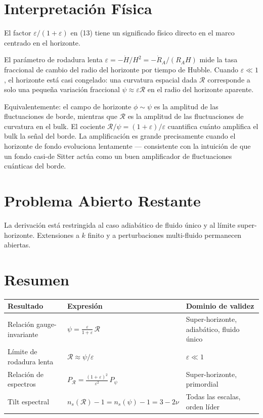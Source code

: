 \documentclass[12pt,a4paper]{article}
\begin{document}
\section{Interpretación Física}

El factor $\varepsilon/(1+\varepsilon)$ en (13) tiene un significado físico directo en el marco centrado en el horizonte.

El parámetro de rodadura lenta $\varepsilon = -\dot{H}/H^2 = -\dot{R}_A/(R_A H)$ mide la tasa fraccional de cambio del radio del horizonte por tiempo de Hubble. Cuando $\varepsilon \ll 1$, el horizonte está casi congelado: una curvatura espacial dada $\mathcal{R}$ corresponde a solo una pequeña variación fraccional $\psi \approx \varepsilon \mathcal{R}$ en el radio del horizonte aparente.

Equivalentemente: el campo de horizonte $\phi \sim \psi$ es la amplitud de las fluctuaciones de borde, mientras que $\mathcal{R}$ es la amplitud de las fluctuaciones de curvatura en el bulk. El cociente $\mathcal{R}/\psi = (1+\varepsilon)/\varepsilon$ cuantifica cuánto amplifica el bulk la señal del borde. La amplificación es grande precisamente cuando el horizonte de fondo evoluciona lentamente --- consistente con la intuición de que un fondo casi-de Sitter actúa como un buen amplificador de fluctuaciones cuánticas del borde.

\section{Problema Abierto Restante}

La derivación está restringida al caso adiabático de fluido único y al límite super-horizonte. Extensiones a $k$ finito y a perturbaciones multi-fluido permanecen abiertas.

\section{Resumen}

\begin{table}[h]
\centering
\begin{tabular}{lll}
\toprule
Resultado & Expresión & Dominio de validez \\
\midrule
Relación gauge-invariante & $\psi = \frac{\varepsilon}{1+\varepsilon}\,\mathcal{R}$ & Super-horizonte, adiabático, fluido único \\
Límite de rodadura lenta & $\mathcal{R} \approx \psi/\varepsilon$ & $\varepsilon \ll 1$ \\
Relación de espectros & $P_\mathcal{R} = \frac{(1+\varepsilon)^2}{\varepsilon^2}\,P_\psi$ & Super-horizonte, primordial \\
Tilt espectral & $n_s(\mathcal{R}) - 1 = n_s(\psi) - 1 = 3 - 2\nu$ & Todas las escalas, orden líder \\
\bottomrule
\end{tabular}
\end{table}
\end{document}
